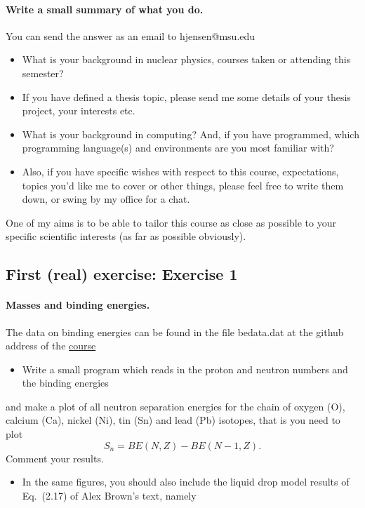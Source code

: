 \documentclass[%
oneside,                 %
final,                   %
10pt]{article}
\begin{document}
\paragraph{Write a small summary of what you do.}
You can send the answer as an email to hjensen@msu.edu
\begin{itemize}
\item What is your background in nuclear physics, courses taken or attending this semester? 

\item If you have defined a thesis topic, please send me some details of your thesis project, your interests etc.

\item What is your background in computing? And, if you have programmed, which programming language(s) and environments  are you  most familiar with?  

\item Also, if you have specific wishes with respect to this course, expectations, topics you'd like me to cover or other things, please feel free to write them down, or swing by my office for a chat. 
\end{itemize}

\noindent
One of my aims is to be able to tailor this course as close as possible to your specific scientific interests (as far as possible obviously).



\subsection*{First (real) exercise: Exercise 1}

\paragraph{Masses and binding energies.}
The data on binding energies can be found in the file bedata.dat at the github address of the \href{{https://github.com/NuclearStructure/PHY981/tree/master/doc/pub/spdata/programs}}{course}

\begin{itemize}
  \item Write a small program which reads in the proton and neutron numbers and the binding energies 
\end{itemize}

\noindent
and make a plot of all neutron separation energies for the chain of oxygen (O), calcium (Ca), nickel (Ni), tin (Sn) and lead (Pb) isotopes, that is you need to plot
\[
S_n= BE(N,Z)-BE(N-1,Z).
\]
Comment your results. 
\begin{itemize}
 \item In the same figures, you should also include the liquid drop model results of Eq.~(2.17) of Alex Brown's text, namely
\end{itemize}
\end{document}
